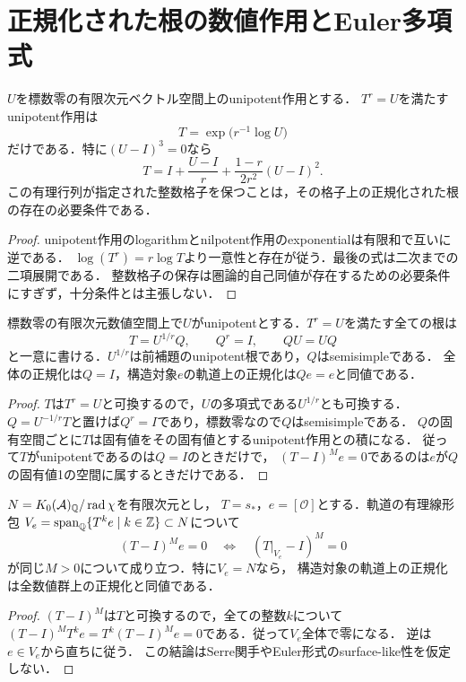 \documentclass[11pt,a4paper]{ltjsarticle}
\begin{document}
\section{正規化された根の数値作用とEuler多項式}
\begin{lemma}[一意な数値的根]\label{lem:unique-root}
$U$を標数零の有限次元ベクトル空間上のunipotent作用とする．
$T^r=U$を満たすunipotent作用は
\[
 T=\exp\bigl(r^{-1}\log U\bigr)
\]
だけである．特に$(U-I)^3=0$なら
\[
 T=I+\frac{U-I}{r}+\frac{1-r}{2r^2}(U-I)^2.
\]
この有理行列が指定された整数格子を保つことは，その格子上の正規化された根の存在の必要条件である．
\end{lemma}
\begin{proof}
unipotent作用のlogarithmとnilpotent作用のexponentialは有限和で互いに逆である．
$\log(T^r)=r\log T$より一意性と存在が従う．最後の式は二次までの二項展開である．
整数格子の保存は圏論的自己同値が存在するための必要条件にすぎず，十分条件とは主張しない．
\end{proof}

\begin{corollary}[有限位数部分の分離]\label{cor:finite-part}
標数零の有限次元数値空間上で$U$がunipotentとする．$T^r=U$を満たす全ての根は
\[
 T=U^{1/r}Q,\qquad Q^r=I,\qquad QU=UQ
\]
と一意に書ける．$U^{1/r}$は前補題のunipotent根であり，$Q$はsemisimpleである．
全体の正規化は$Q=I$，構造対象$e$の軌道上の正規化は$Qe=e$と同値である．
\end{corollary}
\begin{proof}
$T$は$T^r=U$と可換するので，$U$の多項式である$U^{1/r}$とも可換する．
$Q=U^{-1/r}T$と置けば$Q^r=I$であり，標数零なので$Q$はsemisimpleである．
$Q$の固有空間ごとに$T$は固有値をその固有値とするunipotent作用との積になる．
従って$T$がunipotentであるのは$Q=I$のときだけで，
$(T-I)^Me=0$であるのは$e$が$Q$の固有値1の空間に属するときだけである．
\end{proof}

\begin{proposition}[軌道の数値的生成性と正規化]\label{prop:orbit-spanning-normalization}
$N=K_0(\mathcal A)_{\mathbb Q}/\operatorname{rad}\chi$を有限次元とし，
$T=s_*$，$e=[\mathcal O]$とする．軌道の有理線形包
$V_e=\operatorname{span}_{\mathbb Q}\{T^ke\mid k\in\mathbb Z\}\subset N$について
\[
 (T-I)^Me=0\quad\Longleftrightarrow\quad
 (T|_{V_e}-I)^M=0
\]
が同じ$M>0$について成り立つ．特に$V_e=N$なら，
構造対象の軌道上の正規化は全数値群上の正規化と同値である．
\end{proposition}
\begin{proof}
$(T-I)^M$は$T$と可換するので，全ての整数$k$について
$(T-I)^MT^ke=T^k(T-I)^Me=0$である．従って$V_e$全体で零になる．
逆は$e\in V_e$から直ちに従う．
この結論はSerre関手やEuler形式のsurface-like性を仮定しない．
\end{proof}
\end{document}
